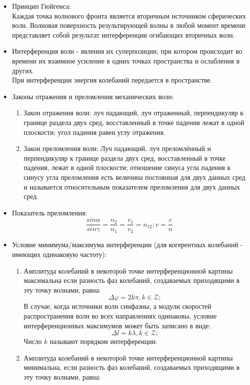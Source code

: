 \documentclass{article}
\begin{document}
\begin{flushleft}
\begin{itemize}
        \item Принцип Гюйгенса:
        \\ Каждая точка волнового фронта является вторичным источником сферических волн. Волновая поверхность результирующей волны в любой момент времени представляет собой результат интерференции огибающих вторичных волн. 
        \item Интерференция волн - явления их суперпозиции, при котором происходит во времени их взаимное усиление в одних точках пространства и ослабления в других. \\ При интерференции энергия колебаний передается в пространстве.
        \item Законы отражения и преломления механических волн:
        \begin{enumerate}
            \item Закон отражения волн: луч падающий, луч отраженный, перпендикуляр к границе раздела двух сред, восставленный в точке падения лежат в одной плоскости; угол падения равен углу отражения.
            \item Закон преломления волн: Луч падающий, луч преломлённый и перпендикуляр к границе раздела двух сред, восставленный в точке падения, лежат в одной плоскости; отношение синуса угла падения к синусу угла преломления есть величина постоянная для двух данных сред и называется относительным показателем преломления для двух данных сред.
        \end{enumerate}
        \item Показатель преломления: 
            \[
            \frac{sin{\alpha}}{sin{\gamma}} = \frac{n_2}{n_1} = \frac{v_1}{v_2} = n_{12}; v = \frac{c}{n}
            \]
        \item Условие минимума/максимума интерференции (для когерентных колебаний - имеющих одинаковую частоту): 
        \begin{enumerate}
            \item Амплитуда колебаний в некоторой точке интерференционной картины максимальна если разность фаз колебаний, создаваемых приходящими в эту точку волнами, равна:  \[
            \Delta \varphi = 2k \pi, k \in \mathcal{Z};
            \]
            В случае, когда источники волн синфазны, а модули скоростей распространения волн во всех направлениях одинаковы, условие интерференционных максимумов может быть записано в виде: \[
            \Delta l = k \lambda, k \in \mathcal{Z};
            \]
            Число $k$ называют порядком интерференции.
            \item Амплитуда колебаний в некоторой точке интерференционной картины минимальна, если разность фаз колебаний, создаваемых приходящими в эту точку волнами, равна: \[
\]
\end{enumerate}
\end{itemize}
\end{flushleft}
\end{document}
